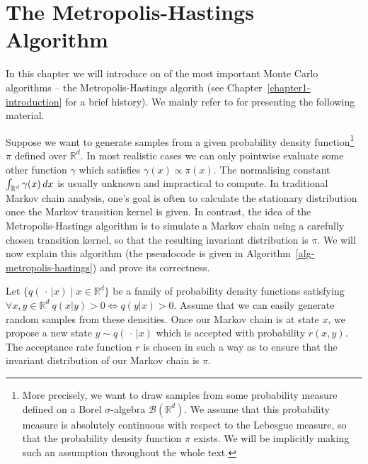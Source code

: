 \documentclass[report.tex]{subfiles}
\begin{document}
\chapter{The Metropolis-Hastings Algorithm}
\label{appendix-metropolis-hastings}

In this chapter we will introduce on of the most important Monte Carlo
algorithms -- the Metropolis-Hastings algorith (see Chapter~\ref{chapter1-introduction}
for a brief history).
We mainly refer to \citet{liu2008monte} for presenting the following material.

Suppose we want to generate samples from a given probability density function\footnote{
  More precisely, we want to draw samples from some probability measure
  defined on a Borel $\sigma$-algebra $\mathcal{B}(\mathbb{R}^{d})$. We assume
  that this probability measure is absolutely continuous with respect to the
  Lebesgue measure, so that the probability density function $\pi$ exists.
  We will be implicitly making such an assumption throughout the whole text.
}
$\pi$ defined over $\mathbb{R}^{d}$. In most
realistic cases we can only pointwise evaluate some other function $\gamma$ which
satisfies $\gamma(x) \propto \pi(x)$.
The normalising constant
$\int_{{\mathbb{R}^{d}}}^{{}} {\gamma(x)}\, d{x}$ is usually unknown and impractical
to compute.
In traditional Markov chain analysis, one's goal is often to calculate
the stationary distribution once the Markov transition kernel is given.
In contrast, the idea of the Metropolis-Hastings algorithm is to
simulate a Markov chain using a carefully chosen transition kernel,
so that the resulting invariant distribution is $\pi$.
We will now explain this algorithm
(the pseudocode is given in Algorithm~\ref{alg-metropolis-hastings})
and prove its correctness.

Let $\{q(\,\cdot\, \vert x) \mid x \in \mathbb{R}^d\}$
be a family of probability density functions satisfying
$\forall x,y \in \mathbb{R}^{d}\ q(x \vert y) > 0 \Leftrightarrow q(y \vert x) > 0$.
Assume that we can easily generate random samples from these densities.
Once our Markov chain is at state $x$, we propose a new state
$y \sim q(\,\cdot\, \vert x)$ which is accepted with probability
$r(x, y)$. The acceptance rate function $r$ is chosen in such a way as to
ensure that the invariant distribution of our Markov chain is $\pi$.
\end{document}

